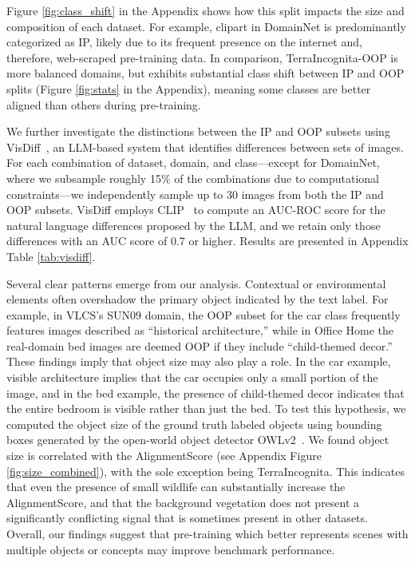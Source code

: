 \documentclass{article} %
\begin{document}
Figure \ref{fig:class_shift} in the Appendix shows how this split impacts the size and composition of each dataset. %
For example, clipart in DomainNet is predominantly categorized as IP, likely due to its frequent presence on the internet and, therefore, web-scraped pre-training data. In comparison, TerraIncognita-OOP is more balanced domains, but exhibits substantial class shift between IP and OOP splits (Figure \ref{fig:stats} in the Appendix), meaning some classes are better aligned than others during pre-training. 

We further investigate the distinctions between the IP and OOP subsets using VisDiff~\citep{VisDiff}, an LLM-based system that identifies differences between sets of images. For each combination of dataset, domain, and class—except for DomainNet, where we subsample roughly 15\% of the combinations due to computational constraints—we independently sample up to 30 images from both the IP and OOP subsets. VisDiff employs CLIP~\citep{radford2021learning} to compute an AUC-ROC score for the natural language differences proposed by the LLM, and we retain only those differences with an AUC score of 0.7 or higher. Results are presented in Appendix Table \ref{tab:visdiff}.

Several clear patterns emerge from our analysis. Contextual or environmental elements often overshadow the primary object indicated by the text label. For example, in  VLCS’s SUN09 domain, the OOP subset for the car class frequently features images described as “historical architecture,” while in Office Home the real-domain bed images are deemed OOP if they include “child-themed decor.” These findings imply that object size may also play a role. In the car example, visible architecture implies that the car occupies only a small portion of the image, and in the bed example, the presence of child-themed decor indicates that the entire bedroom is visible rather than just the bed. To test this hypothesis, we computed the object size of the ground truth labeled objects using bounding boxes generated by the open-world object detector OWLv2~\citep{minderer2023scaling}. We found object size is correlated with the AlignmentScore (see Appendix Figure \ref{fig:size_combined}), with the sole exception being TerraIncognita. This indicates that even the presence of small wildlife can substantially increase the AlignmentScore, and that the background vegetation does not present a significantly conflicting signal that is sometimes present in other datasets.  Overall, our findings suggest that pre-training which better represents scenes with multiple objects or concepts may improve benchmark performance. 
\end{document}
